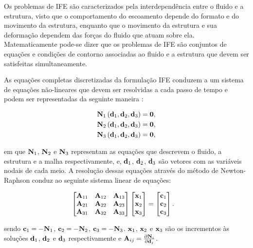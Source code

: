 Os problemas de IFE são caracterizados pela interdependência entre o fluido e a estrutura, visto que o comportamento do escoamento depende do formato e do movimento da estrutura, enquanto que o movimento da estrutura e sua deformação dependem das forças do fluido que atuam sobre ela. Matematicamente pode-se dizer que os problemas de IFE são conjuntos de equações e condições de contorno associadas ao fluido e a estrutura que devem ser satisfeitas simultaneamente.

As equações completas discretizadas da formulação IFE conduzem a um sistema de equações não-lineares que devem ser resolvidas a cada passo de tempo e podem ser representadas da seguinte maneira \cite{BazilevsTT:2013a}:

\begin{align}
	\mathbf{N}_{1}\left(\mathbf{d}_{1},\mathbf{d}_{2},\mathbf{d}_{3}\right) = \mathbf{0}, \label{eq:N1}\\ 
	\mathbf{N}_{2}\left(\mathbf{d}_{1},\mathbf{d}_{2},\mathbf{d}_{3}\right) = \mathbf{0},\label{eq:N2}\\
	\mathbf{N}_{3}\left(\mathbf{d}_{1},\mathbf{d}_{2},\mathbf{d}_{3}\right) = \mathbf{0} \label{eq:N3},
\end{align}

\noindent em que $\mathbf{N}_{1}$, $\mathbf{N}_{2}$ e $\mathbf{N}_{3}$ representam as equações que descrevem o fluido, a estrutura e a malha respectivamente, e, $\mathbf{d}_{1}$, $\mathbf{d}_{2}$, $\mathbf{d}_{3}$ são vetores com as variáveis nodais de cada meio. 
A resolução dessas equações através do método de Newton-Raphson conduz ao seguinte sistema linear de equações:

\begin{align}
	\begin{bmatrix}
		\mathbf{A}_{11} & \mathbf{A}_{12} & \mathbf{A}_{13} \\
		\mathbf{A}_{21} & \mathbf{A}_{22} & \mathbf{A}_{23} \\
		\mathbf{A}_{31} & \mathbf{A}_{32} & \mathbf{A}_{33}
	\end{bmatrix}
	\begin{bmatrix}
		\mathbf{x}_{1} \\
		\mathbf{x}_{2} \\
		\mathbf{x}_{3}
	\end{bmatrix}
	&=
	\begin{bmatrix}
		\mathbf{c}_{1} \\
		\mathbf{c}_{2} \\
		\mathbf{c}_{3}
	\end{bmatrix}.
	\label{eq:sist_lin_IFE}
\end{align}	

\noindent sendo $\mathbf{c}_{1} = - \mathbf{N}_{1}$, $\mathbf{c}_{2} = - \mathbf{N}_{2}$, $\mathbf{c}_{3} = - \mathbf{N}_{3}$. $\mathbf{x}_{1}$, $\mathbf{x}_{2}$ e $\mathbf{x}_{3}$ são os incrementos às soluções $\mathbf{d}_{1}$, $\mathbf{d}_{2}$ e $\mathbf{d}_{3}$ respectivamente e $\mathbf{A}_{ij} = \frac{\partial\mathbf{N}_{i}}{\partial\mathbf{d}_{j}}$. 


